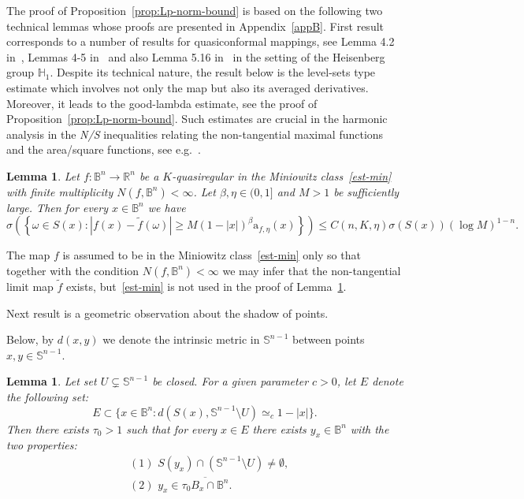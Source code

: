 \documentclass[11pt,a4paper,reqno]{amsart}
\newtheorem{lem}[theorem]{Lemma}
\theoremstyle{definition}
\newcommand{\om}{\omega}
\newcommand{\B}{\mathbb{B}^n}
\newcommand{\R}{\mathbb{R}}
\newcommand{\Sn}{\mathbb{S}^{n-1}}
\numberwithin{komcounter}{section}
\begin{document}
The proof of Proposition~\ref{prop:Lp-norm-bound} is based on the following two technical lemmas whose proofs are presented in Appendix~\ref{appB}. First result corresponds to a number of results for quasiconformal mappings, see Lemma 4.2 in~\cite{ak}, Lemmas 4-5 in~\cite{z} and also Lemma 5.16 in~\cite{af} in the setting of the Heisenberg group $\mathbb{H}_1$.
Despite its technical nature, the result below is the level-sets type estimate which involves not only the map but also its averaged derivatives. Moreover, it leads to the good-lambda estimate, see the proof of Proposition~\ref{prop:Lp-norm-bound}. Such estimates are crucial in the harmonic analysis in the \emph{N/S} inequalities relating the non-tangential maximal functions and the area/square functions, see e.g.~\cite{dah, hmm, mit}.

\begin{lem}\label{lem:shadowmeasure}
	Let $f:\B\rightarrow \R^n$ be a $K$-quasiregular in the Miniowitz class~\eqref{est-min} with finite multiplicity $N(f,\B )<\infty $. Let $\beta ,\eta\in (0,1]$ and $M>1$ be sufficiently large. Then for every $x\in\B$ we have
$$
 \sigma\left(\left\{ \om \in S(x): |f(x)-\tilde{f}(\om)|\geq M(1-|x|)^\beta\mathrm a_{f,\eta} (x)\right\}\right)\leq C(n,K,\eta) \sigma (S(x))(\log M)^{1-n}.
$$
\end{lem}

The map $f$ is assumed to be in the Miniowitz class~\eqref{est-min} only so that together with the condition $N(f,\B )<\infty $ we may infer that the non-tangential limit map $\tilde{f}$ exists, but~\eqref{est-min} is not used in the proof of Lemma~\ref{lem:shadowmeasure}. 

Next result is a geometric observation about the shadow of points.

Below, by $d(x, y)$ we denote the intrinsic metric in $\Sn$ between points $x,y\in \Sn$.

\begin{lem}\label{lem:leavingshadow}
	Let set $U\subsetneq \Sn$ be closed. For a given parameter $c>0$, let $E$ denote the following set:
	\[
	 E\subset \{x\in \B : d(S(x),\Sn\setminus U)\simeq_{c} 1-|x| \}.
	\]
	Then there exists $\tau_0>1$ such that for every $x\in E$ there exists $y_x\in \B$ with the two properties:
	\begin{align}
	&(1)\,\,S(y_x)\cap (\Sn\setminus U)\neq\emptyset,  \label{prop1:lem-shadow}\\
	&(2)\,\,y_x \in \overline{\tau_0 B_x\cap \B}. \label{prop2:lem-shadow}
	\end{align}
\end{lem}
\end{document}
